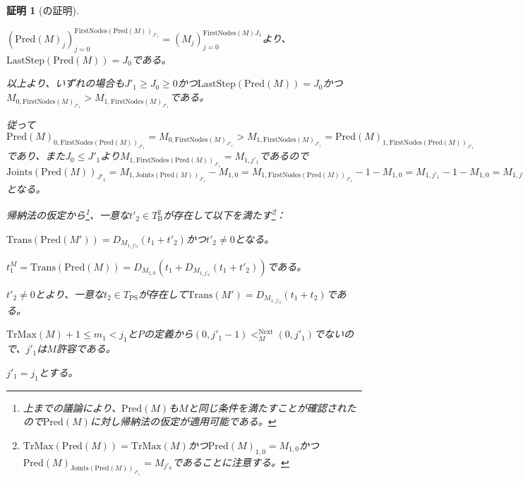 \documentclass[dvipdfmx,uplatex]{jsarticle}
\theoremstyle{customnonumberbreakfortheorem}
\theoremstyle{customnonumberbreakforproof}
\newtheorem{hideableproof}{証明}
\begin{document}
\begin{hideableproof}[の証明]
\begin{indented}
\begin{indented}
\begin{indented}
				\item \((\textrm{Pred}(M)_j)_{j=0}^{\textrm{FirstNodes}(\textrm{Pred}(M))_{J'_1}} = (M_j)_{j=0}^{\textrm{FirstNodes}(M){J_1}}\)より、\(\textrm{LastStep}(\textrm{Pred}(M)) = J_0\)である。
			\end{indented}
			\item
			\item 以上より、いずれの場合も\(J'_1 \geq J_0 \geq 0\)かつ\(\textrm{LastStep}(\textrm{Pred}(M)) = J_0\)かつ\(M_{0,\textrm{FirstNodes}(M)_{J'_1}} > M_{1,\textrm{FirstNodes}(M)_{J'_1}}\)である。
			\item 従って\(\textrm{Pred}(M)_{0,\textrm{FirstNodes}(\textrm{Pred}(M))_{J'_1}} = M_{0,\textrm{FirstNodes}(M)_{J'_1}} > M_{1,\textrm{FirstNodes}(M)_{J'_1}} = \textrm{Pred}(M)_{1,\textrm{FirstNodes}(\textrm{Pred}(M))_{J'_1}}\)であり、また\(J_0 \leq J'_1\)より\(M_{1,\textrm{FirstNodes}(\textrm{Pred}(M))_{J'_1}} = M_{1,j'_1}\)であるので\(\textrm{Joints}(\textrm{Pred}(M))_{J'_1} = M_{1,\textrm{Joints}(\textrm{Pred}(M))_{J'_1}} - M_{1,0} = M_{1,\textrm{FirstNodes}(\textrm{Pred}(M))_{J'_1}} - 1 - M_{1,0} = M_{1,j'_1} - 1 - M_{1,0} = M_{1,j'_0} - M_{1,0} = j'_0 > 0\)となる。
			\item 帰納法の仮定から\footnote{上までの議論により、\(\textrm{Pred}(M)\)も\(M\)と同じ条件を満たすことが確認されたので\(\textrm{Pred}(M)\)に対し帰納法の仮定が適用可能である。}、一意な\(t'_2 \in T_{\textrm{B}}^2\)が存在して以下を満たす\footnote{\(\textrm{TrMax}(\textrm{Pred}(M)) = \textrm{TrMax}(M)\)かつ\(\textrm{Pred}(M)_{1,0} = M_{1,0}\)かつ\(\textrm{Pred}(M)_{\textrm{Joints}(\textrm{Pred}(M))_{J'_1}} = M_{j'_0}\)であることに注意する。}：
			\begin{penumerate}
				\setcounter{penumeratei}{2}
				\item \(\textrm{Trans}(\textrm{Pred}(M')) = D_{M_{1,j'_0}}(t_1 + t'_2)\)かつ\(t'_2 \neq 0\)となる。
				\item \(t_1^M = \textrm{Trans}(\textrm{Pred}(M)) = D_{M_{1,0}}(t_1 + D_{M_{1,j'_0}}(t_1 + t'_2))\)である。
			\end{penumerate}
			\item \(t'_2 \neq 0\)とより、一意な\(t_2 \in T_{\textrm{PS}}\)が存在して\(\textrm{Trans}(M') = D_{M_{1,j'_0}}(t_1 + t_2)\)である。
			\item \(\textrm{TrMax}(M)+1 \leq m_1 < j_1\)と\(P\)の定義から\((0,j'_1-1) <_M^{\textrm{Next}} (0,j'_1)\)でないので、\(j'_1\)は\(M\)許容である。
			\item
			\item \(j'_1 = j_1\)とする。

\end{indented}
\end{indented}
\end{hideableproof}
\end{document}
